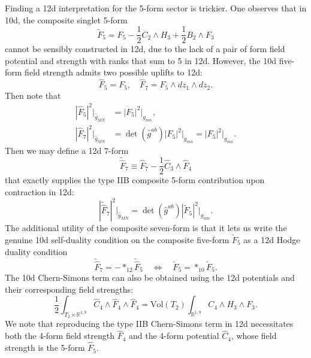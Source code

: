 Finding a 12d interpretation for the 5-form sector is trickier. 
One observes that in 10d, the composite \SLR{} singlet 5-form 
\begin{equation}
\tilde F_5 = F_5 - \frac12 C_2 \wedge H_3 + \frac{1}{2}B_2\wedge F_3    
\end{equation}
cannot be sensibly constructed in 12d, due to the lack of a pair of form field potential and strength with ranks that sum to 5 in 12d.
However, the 10d five-form field strength admits two possible uplifts to 12d:
\begin{equation}
\widehat{F}_5 = F_5,\quad \widehat{F}_7=F_5\wedge dz_1 \wedge dz_2.
\end{equation}
Then note that
\begin{equation}
\begin{aligned}
|\widehat{F}_5|^2\bigg|_{\widehat{g}_{MN}} 
&= |F_5|^2\bigg|_{g_{mn}},\\
|\widehat{F}_7|^2\bigg|_{\widehat{g}_{MN}}
&=\det(\widehat{g}^{ab})|F_5|^2\bigg|_{g_{mn}} = |F_5|^2\bigg|_{g_{mn}}.
\end{aligned}
\end{equation}
Then we may define a 12d 7-form
\begin{equation}
\widetilde{\widehat{F}}_7 \equiv \widehat{F}_7 - \frac{1}{2}\widehat{C}_3 \wedge \widehat{F}_4
\end{equation}
that exactly supplies the type IIB composite 5-form contribution upon contraction in 12d:
\begin{equation}
|\widetilde{\widehat{F}}_7|^2\bigg|_{\widehat{g}_{MN}} =
\det(\widehat{g}^{ab})|\tilde F_5|^2\bigg|_{g_{mn}}.
\end{equation}
The additional utility of the composite seven-form is that it lets us write the genuine 10d self-duality condition on the composite five-form $\tilde F_5$ as a 12d Hodge duality condition
\begin{equation}
\widetilde{\widehat{F}}_7 = -*_{12}\widetilde{\widehat{F}}_5\quad
\Leftrightarrow\quad
\tilde F_5 = *_{10}\tilde F_5.
\label{12d interpretation of 10d self-duality}
\end{equation}
The 10d Chern-Simons term can also be obtained using the 12d potentials and their corresponding field strengths:
\begin{equation}
\frac{1}{2}\int_{T_2\times \mathbb{R}^{1,9}} \widehat{C}_4\wedge \widehat{F}_4\wedge\widehat{F}_4=
\mathrm{Vol}(T_2)\int_{\mathbb{R}^{1,9}}C_4\wedge H_3\wedge F_3.
\end{equation}
We note that reproducing the type IIB Chern-Simons term in 12d necessitates both the 4-form field strength $\widehat F_4$ and the 4-form potential $\widehat C_4$, whose field strength is the 5-form $\widehat F_5$.

